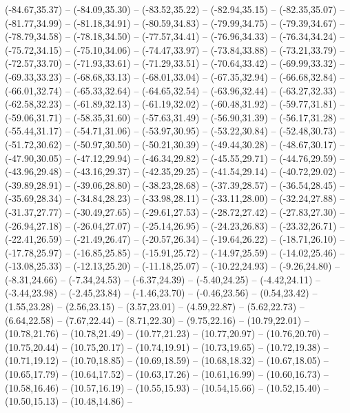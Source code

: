 {  (-84.67,35.37) -- (-84.09,35.30) -- (-83.52,35.22) -- (-82.94,35.15) -- (-82.35,35.07) -- (-81.77,34.99) -- (-81.18,34.91) --
  (-80.59,34.83) -- (-79.99,34.75) -- (-79.39,34.67) -- (-78.79,34.58) -- (-78.18,34.50) -- (-77.57,34.41) -- (-76.96,34.33) --
  (-76.34,34.24) -- (-75.72,34.15) -- (-75.10,34.06) -- (-74.47,33.97) -- (-73.84,33.88) -- (-73.21,33.79) -- (-72.57,33.70) --
  (-71.93,33.61) -- (-71.29,33.51) -- (-70.64,33.42) -- (-69.99,33.32) -- (-69.33,33.23) -- (-68.68,33.13) -- (-68.01,33.04) --
  (-67.35,32.94) -- (-66.68,32.84) -- (-66.01,32.74) -- (-65.33,32.64) -- (-64.65,32.54) -- (-63.96,32.44) -- (-63.27,32.33) --
  (-62.58,32.23) -- (-61.89,32.13) -- (-61.19,32.02) -- (-60.48,31.92) -- (-59.77,31.81) -- (-59.06,31.71) -- (-58.35,31.60) --
  (-57.63,31.49) -- (-56.90,31.39) -- (-56.17,31.28) -- (-55.44,31.17) -- (-54.71,31.06) -- (-53.97,30.95) -- (-53.22,30.84) --
  (-52.48,30.73) -- (-51.72,30.62) -- (-50.97,30.50) -- (-50.21,30.39) -- (-49.44,30.28) -- (-48.67,30.17) -- (-47.90,30.05) --
  (-47.12,29.94) -- (-46.34,29.82) -- (-45.55,29.71) -- (-44.76,29.59) -- (-43.96,29.48) -- (-43.16,29.37) -- (-42.35,29.25) --
  (-41.54,29.14) -- (-40.72,29.02) -- (-39.89,28.91) -- (-39.06,28.80) -- (-38.23,28.68) -- (-37.39,28.57) -- (-36.54,28.45) --
  (-35.69,28.34) -- (-34.84,28.23) -- (-33.98,28.11) -- (-33.11,28.00) -- (-32.24,27.88) -- (-31.37,27.77) -- (-30.49,27.65) --
  (-29.61,27.53) -- (-28.72,27.42) -- (-27.83,27.30) -- (-26.94,27.18) -- (-26.04,27.07) -- (-25.14,26.95) -- (-24.23,26.83) --
  (-23.32,26.71) -- (-22.41,26.59) -- (-21.49,26.47) -- (-20.57,26.34) -- (-19.64,26.22) -- (-18.71,26.10) -- (-17.78,25.97) --
  (-16.85,25.85) -- (-15.91,25.72) -- (-14.97,25.59) -- (-14.02,25.46) -- (-13.08,25.33) -- (-12.13,25.20) -- (-11.18,25.07) --
  (-10.22,24.93) -- (-9.26,24.80) -- (-8.31,24.66) -- (-7.34,24.53) -- (-6.37,24.39) -- (-5.40,24.25) -- (-4.42,24.11) --
  (-3.44,23.98) -- (-2.45,23.84) -- (-1.46,23.70) -- (-0.46,23.56) -- (0.54,23.42) -- (1.55,23.28) -- (2.56,23.15) --
  (3.57,23.01) -- (4.59,22.87) -- (5.62,22.73) -- (6.64,22.58) -- (7.67,22.44) -- (8.71,22.30) -- (9.75,22.16) --
  (10.79,22.01) -- (10.78,21.76) -- (10.78,21.49) -- (10.77,21.23) -- (10.77,20.97) -- (10.76,20.70) -- (10.75,20.44) --
  (10.75,20.17) -- (10.74,19.91) -- (10.73,19.65) -- (10.72,19.38) -- (10.71,19.12) -- (10.70,18.85) -- (10.69,18.59) --
  (10.68,18.32) -- (10.67,18.05) -- (10.65,17.79) -- (10.64,17.52) -- (10.63,17.26) -- (10.61,16.99) -- (10.60,16.73) --
  (10.58,16.46) -- (10.57,16.19) -- (10.55,15.93) -- (10.54,15.66) -- (10.52,15.40) -- (10.50,15.13) -- (10.48,14.86) --
}
